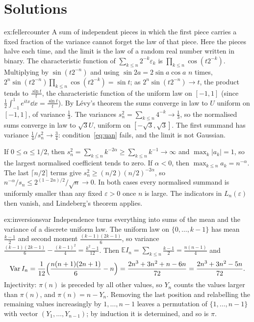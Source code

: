 \section{Solutions}

\begin{solution}{ex:fellercounter}
\idea A sum of independent pieces in which the first piece carries a fixed fraction of the variance cannot forget the law of that piece. Here the
pieces halve each time, and the limit is the law of a random real number written in binary.
\writeup The characteristic function of $\sum_{k\le n}2^{-k}\varepsilon_k$ is $\prod_{k\le n}\cos(t2^{-k})$. Multiplying by $\sin(t2^{-n})$ and using
$\sin2a=2\sin a\cos a$ $n$ times, $2^n\sin(t2^{-n})\prod_{k\le n}\cos(t2^{-k})=\sin t$; as $2^n\sin(t2^{-n})\to t$, the product tends to $\frac{\sin t}t$, the characteristic
function of the uniform law on $[-1,1]$ (since $\frac12\int_{-1}^1e^{itx}\dd x=\frac{\sin t}t$). By L\'evy's theorem the sums converge in law to $U$ uniform on
$[-1,1]$, of variance $\frac13$. The variances $s_n^2=\sum_{k\le n}4^{-k}\to\frac13$, so the normalised sums converge in law to $\sqrt3U$, uniform on $[-\sqrt3,\sqrt3]$.
The first summand has variance $\frac14/s_n^2\to\frac34$: condition~\eqref{eq:uan} fails, and the limit is not Gaussian.

If $0\le\alpha\le1/2$, then $s_n^2=\sum_{k\le n}k^{-2\alpha}\ge\sum_{k\le n}k^{-1}\to\infty$ and $\max_k|a_k|=1$, so the largest normalised coefficient tends to zero. If $\alpha<0$, then $\max_{k\le n}a_k=n^{-\alpha}$. The last $\lceil n/2\rceil$ terms give $s_n^2\ge(n/2)(n/2)^{-2\alpha}$, so $n^{-\alpha}/s_n\le 2^{(1-2\alpha)/2}/\sqrt n\to0$. In both cases every normalised summand is uniformly smaller than any fixed $\varepsilon>0$ once $n$ is large. The indicators in $L_n(\varepsilon)$ then vanish, and Lindeberg's theorem applies.
\end{solution}

\begin{solution}{ex:inversionsvar}
\idea Independence turns everything into sums of the mean and the variance of a discrete uniform law.
\writeup The uniform law on $\{0,\dots,k-1\}$ has mean $\frac{k-1}2$ and second moment $\frac{(k-1)(2k-1)}6$, so variance $\frac{(k-1)(2k-1)}6-\frac{(k-1)^2}4=\frac{k^2-1}{12}$.
Then $\mathbb EI_n=\sum_{k\le n}\frac{k-1}2=\frac{n(n-1)}4$ and
\[
\operatorname{Var}I_n=\frac1{12}\Bigl(\frac{n(n+1)(2n+1)}6-n\Bigr)=\frac{2n^3+3n^2+n-6n}{72}=\frac{2n^3+3n^2-5n}{72}.
\]
Injectivity: $\pi(n)$ is preceded by all other values, so $Y_n$ counts the values larger than $\pi(n)$, and $\pi(n)=n-Y_n$. Removing the last position
and relabelling the remaining values increasingly by $1,\dots,n-1$ leaves a permutation of $\{1,\dots,n-1\}$ with vector $(Y_1,\dots,Y_{n-1})$; by
induction it is determined, and so is $\pi$.
\end{solution}

